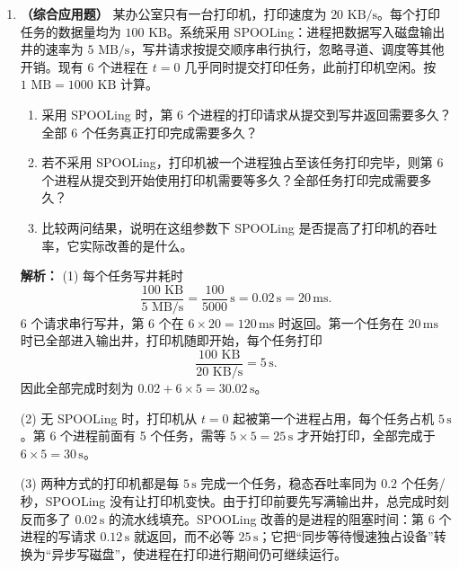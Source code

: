 \begin{enumerate}[resume]
\vspace{8pt}

\item \textbf{（综合应用题）} 某办公室只有一台打印机，打印速度为 $20\text{ KB/s}$。每个打印任务的数据量均为 $100\text{ KB}$。系统采用 SPOOLing：进程把数据写入磁盘输出井的速率为 $5\text{ MB/s}$，写井请求按提交顺序串行执行，忽略寻道、调度等其他开销。现有 6 个进程在 $t=0$ 几乎同时提交打印任务，此前打印机空闲。按 $1\text{ MB}=1000\text{ KB}$ 计算。
\begin{enumerate}
    \item[(1)] 采用 SPOOLing 时，第 6 个进程的打印请求从提交到写井返回需要多久？全部 6 个任务真正打印完成需要多久？
    \item[(2)] 若不采用 SPOOLing，打印机被一个进程独占至该任务打印完毕，则第 6 个进程从提交到开始使用打印机需要等多久？全部任务打印完成需要多久？
    \item[(3)] 比较两问结果，说明在这组参数下 SPOOLing 是否提高了打印机的吞吐率，它实际改善的是什么。
\end{enumerate}

\ifshowsolutions\par\noindent\textbf{解析：}
(1) 每个任务写井耗时
\[
\frac{100\text{ KB}}{5\text{ MB/s}}=\frac{100}{5000}\,\text{s}=0.02\,\text{s}=20\,\text{ms}.
\]
6 个请求串行写井，第 6 个在 $6\times 20=120\,\text{ms}$ 时返回。第一个任务在 $20\,\text{ms}$ 时已全部进入输出井，打印机随即开始，每个任务打印
\[
\frac{100\text{ KB}}{20\text{ KB/s}}=5\,\text{s}.
\]
因此全部完成时刻为 $0.02+6\times 5=30.02\,\text{s}$。

(2) 无 SPOOLing 时，打印机从 $t=0$ 起被第一个进程占用，每个任务占机 $5\,\text{s}$。第 6 个进程前面有 5 个任务，需等 $5\times 5=25\,\text{s}$ 才开始打印，全部完成于 $6\times 5=30\,\text{s}$。

(3) 两种方式的打印机都是每 $5\,\text{s}$ 完成一个任务，稳态吞吐率同为 $0.2$ 个任务/秒，SPOOLing 没有让打印机变快。由于打印前要先写满输出井，总完成时刻反而多了 $0.02\,\text{s}$ 的流水线填充。SPOOLing 改善的是进程的阻塞时间：第 6 个进程的写请求 $0.12\,\text{s}$ 就返回，而不必等 $25\,\text{s}$；它把“同步等待慢速独占设备”转换为“异步写磁盘”，使进程在打印进行期间仍可继续运行。

\else \answerarea[10] \fi

\vspace{8pt}


\end{enumerate}
